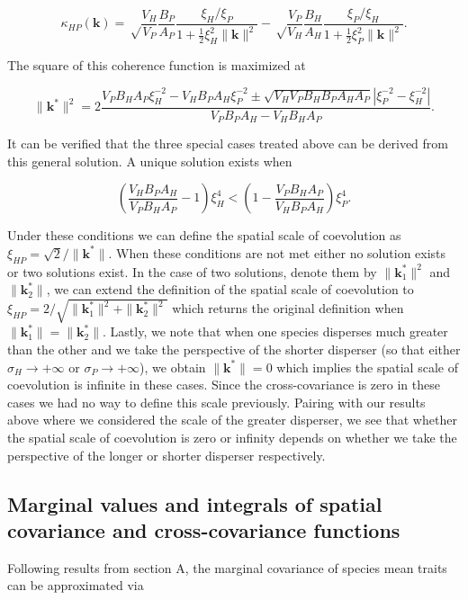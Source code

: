 \documentclass{article}
\begin{document}
\[\kappa_{HP}(\pmb k)=\sqrt\frac{V_H}{V_P}\frac{B_P}{A_P}\frac{\xi_H/\xi_P}{1+\tfrac{1}{2}\xi_H^2\|\pmb k\|^2}-\sqrt\frac{V_P}{V_H}\frac{B_H}{A_H}\frac{\xi_P/\xi_H}{1+\tfrac{1}{2}\xi_P^2\|\pmb k\|^2}.\]

The square of this coherence function is maximized at

\[\|\pmb k^*\|^2=2\frac{V_PB_HA_P\xi_H^{-2}-V_HB_PA_H\xi_P^{-2}\pm\sqrt{V_HV_PB_HB_PA_HA_P}|\xi_P^{-2}-\xi_H^{-2}|}{V_PB_PA_H-V_HB_HA_P}.\]

It can be verified that the three special cases treated above can be
derived from this general solution. A unique solution exists when

\[\left(\frac{V_HB_PA_H}{V_PB_HA_P}-1\right)\xi_H^4<\left(1-\frac{V_PB_HA_P}{V_HB_PA_H}\right)\xi_P^4.\]

Under these conditions we can define the spatial scale of coevolution as
\(\xi_{HP}=\sqrt2/\|\pmb k^*\|\). When these conditions are not met
either no solution exists or two solutions exist. In the case of two
solutions, denote them by \(\|\pmb k_1^*\|^2\) and \(\|\pmb k_2^*\|\),
we can extend the definition of the spatial scale of coevolution to
\(\xi_{HP}=2/\sqrt{\|\pmb k_1^*\|^2+\|\pmb k_2^*\|^2}\) which returns
the original definition when \(\|\pmb k_1^*\|=\|\pmb k_2^*\|\). Lastly,
we note that when one species disperses much greater than the other and
we take the perspective of the shorter disperser (so that either
\(\sigma_H\to+\infty\) or \(\sigma_P\to+\infty\)), we obtain
\(\|\pmb k^*\|=0\) which implies the spatial scale of coevolution is
infinite in these cases. Since the cross-covariance is zero in these
cases we had no way to define this scale previously. Pairing with our
results above where we considered the scale of the greater disperser, we
see that whether the spatial scale of coevolution is zero or infinity
depends on whether we take the perspective of the longer or shorter
disperser respectively.

\hypertarget{marginal-values-and-integrals-of-spatial-covariance-and-cross-covariance-functions}{%
\subsection{Marginal values and integrals of spatial covariance and
cross-covariance
functions}\label{marginal-values-and-integrals-of-spatial-covariance-and-cross-covariance-functions}}

Following results from section A, the marginal covariance of species
mean traits can be approximated via
\end{document}
